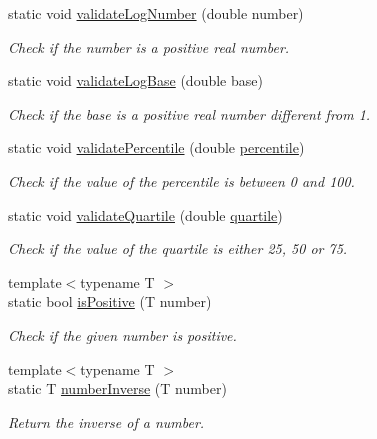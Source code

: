 \begin{DoxyCompactItemize}
static void \hyperlink{classmultiscale_1_1Numeric_a284b70a2cd738a3f37a45439aeb0934c}{validate\-Log\-Number} (double number)
\begin{DoxyCompactList}\small\item\em Check if the number is a positive real number. \end{DoxyCompactList}\item 
static void \hyperlink{classmultiscale_1_1Numeric_a5d8734939e6074e75f6363ac4cfb8d45}{validate\-Log\-Base} (double base)
\begin{DoxyCompactList}\small\item\em Check if the base is a positive real number different from 1. \end{DoxyCompactList}\item 
static void \hyperlink{classmultiscale_1_1Numeric_abe940f7b4f7320912b34590d8297ab7e}{validate\-Percentile} (double \hyperlink{classmultiscale_1_1Numeric_aff0c6b0c3d82bec3761a5e2d08394513}{percentile})
\begin{DoxyCompactList}\small\item\em Check if the value of the percentile is between 0 and 100. \end{DoxyCompactList}\item 
static void \hyperlink{classmultiscale_1_1Numeric_aac8bb87dfc3d3f039089c7b1b5225641}{validate\-Quartile} (double \hyperlink{classmultiscale_1_1Numeric_a127a2b3e5e659b4e493767ba23fc45da}{quartile})
\begin{DoxyCompactList}\small\item\em Check if the value of the quartile is either 25, 50 or 75. \end{DoxyCompactList}\item 
{\footnotesize template$<$typename T $>$ }\\static bool \hyperlink{classmultiscale_1_1Numeric_ac35688ef6f37f33cdf8f91999c07f414}{is\-Positive} (T number)
\begin{DoxyCompactList}\small\item\em Check if the given number is positive. \end{DoxyCompactList}\item 
{\footnotesize template$<$typename T $>$ }\\static T \hyperlink{classmultiscale_1_1Numeric_a2ce4f8dbafed8f6af2a299ff66997318}{number\-Inverse} (T number)
\begin{DoxyCompactList}\small\item\em Return the inverse of a number. \end{DoxyCompactList}\end{DoxyCompactItemize}
